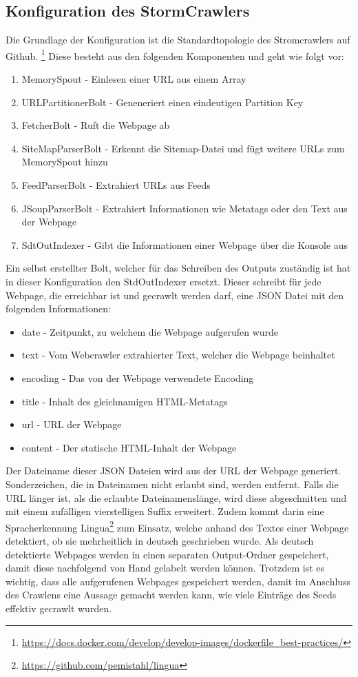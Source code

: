 \subsection{Konfiguration des StormCrawlers}
Die Grundlage der Konfiguration ist die Standardtopologie des Stromcrawlers auf Github.
\footnote{\url{https://docs.docker.com/develop/develop-images/dockerfile_best-practices/}}
Diese besteht aus den folgenden Komponenten und geht wie folgt vor:
\begin{enumerate}
	\item MemorySpout - Einlesen einer URL aus einem Array
	\item URLPartitionerBolt - Geneneriert einen eindeutigen Partition Key
	\item FetcherBolt - Ruft die Webpage ab
	\item SiteMapParserBolt - Erkennt die Sitemap-Datei und fügt weitere URLs zum MemorySpout hinzu
	\item FeedParserBolt - Extrahiert URLs aus Feeds
	\item JSoupParserBolt - Extrahiert Informationen wie Metatags oder den Text aus der Webpage
	\item SdtOutIndexer - Gibt die Informationen einer Webpage über die Konsole aus
\end{enumerate}
Ein selbst erstellter Bolt, welcher für das Schreiben des Outputs zuständig ist hat in dieser Konfiguration den StdOutIndexer ersetzt.
Dieser schreibt für jede Webpage, die erreichbar ist und gecrawlt werden darf, eine JSON Datei mit den folgenden Informationen:
\begin{itemize}
	\item \glqq date \grqq  - Zeitpunkt, zu welchem die Webpage aufgerufen wurde
	\item \glqq text \grqq  - Vom Webcrawler extrahierter Text, welcher die Webpage beinhaltet
	\item \glqq encoding \grqq  - Das von der Webpage verwendete Encoding
	\item \glqq title \grqq  - Inhalt des gleichnamigen HTML-Metatags
	\item \glqq url \grqq  - URL der Webpage
	\item \glqq content \grqq  - Der statische HTML-Inhalt der Webpage	
\end{itemize}
Der Dateiname dieser JSON Dateien wird aus der URL der Webpage generiert. 
Sonderzeichen, die in Dateinamen nicht erlaubt sind, werden entfernt. Falls die URL länger ist, als die erlaubte Dateinamenslänge, wird diese abgeschnitten und mit einem zufälligen vierstelligen Suffix erweitert.
Zudem kommt darin eine Spracherkennung \glqq Lingua\footnote{\url{https://github.com/pemistahl/lingua}}\grqq{} zum Einsatz, welche anhand des Textes einer Webpage detektiert, ob sie mehrheitlich in deutsch geschrieben wurde.
Als deutsch detektierte Webpages werden in einen separaten Output-Ordner gespeichert, damit diese nachfolgend von Hand gelabelt werden können.
Trotzdem ist es wichtig, dass alle aufgerufenen Webpages gespeichert werden, damit im Anschluss des Crawlens eine Aussage gemacht werden kann, wie viele Einträge des Seeds effektiv gecrawlt wurden.

